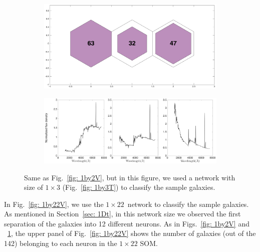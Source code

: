             \begin{figure}
                \begin{subfigure}[b]{0.5\textwidth}
                    \centering
                    \includegraphics[width=\textwidth]{images0.01/1d/hit_v_1_by_3.png}
                \end{subfigure}
                \hfill
                \begin{subfigure}[b]{0.5\textwidth}
                     \includegraphics[width=\textwidth]{images0.01/1d/SED_total1by3_fluxdensity.png}
                \end{subfigure}
                \caption[Classification of fitted galaxy SEDs from \citet{Hossein12} using the $1\times3$~networks]{Same as Fig.~\ref{fig: 1by2V}, but in this figure, we used a network with size of $1\times3$ (Fig.~\ref{fig: 1by3T}) to classify the sample galaxies.}
                \label{fig: 1by3V}
            \end{figure}       
            
            In Fig.~\ref{fig: 1by22V}, we use the $1\times22$~network to classify the sample galaxies.
            As mentioned in Section~\ref{sec: 1Dt}, in this network size we observed the first separation of the  galaxies into 12 different neurons.
           As in Figs.~\ref{fig: 1by2V} and ~\ref{fig: 1by3V}, the upper panel of Fig.~\ref{fig: 1by22V} shows the number of galaxies (out of the 142) belonging to each neuron in the $1\times22$ SOM.

